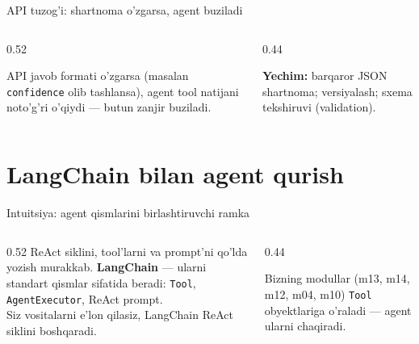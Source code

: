 \documentclass[aspectratio=169,11pt]{beamer}
\begin{document}
\begin{frame}{API tuzog'i: shartnoma o'zgarsa, agent buziladi}
  \begin{columns}[T]
    \begin{column}{0.52\textwidth}
      \begin{tcolorbox}[warnbox,title={Mos kelmagan JSON}]
        \small
        API javob formati o'zgarsa (masalan \texttt{confidence} olib tashlansa),
        agent tool natijani noto'g'ri o'qiydi --- butun zanjir buziladi.
      \end{tcolorbox}
    \end{column}
    \begin{column}{0.44\textwidth}
      \begin{tcolorbox}[okbox,top=2pt,bottom=2pt]
        \footnotesize
        \textbf{Yechim:} barqaror JSON shartnoma; versiyalash; sxema tekshiruvi
        (validation).
      \end{tcolorbox}
    \end{column}
  \end{columns}
\end{frame}

\section[LangChain]{LangChain bilan agent qurish}

\begin{frame}{Intuitsiya: agent qismlarini birlashtiruvchi ramka}
  \begin{columns}[T]
    \begin{column}{0.52\textwidth}
      \small
      ReAct siklini, tool'larni va prompt'ni qo'lda yozish murakkab.
      \textbf{LangChain} --- ularni standart qismlar sifatida beradi:
      \texttt{Tool}, \texttt{AgentExecutor}, ReAct prompt.\\[5pt]
      Siz vositalarni e'lon qilasiz, LangChain ReAct siklini boshqaradi.
    \end{column}
    \begin{column}{0.44\textwidth}
      \begin{tcolorbox}[okbox,top=2pt,bottom=2pt]
        \footnotesize
        Bizning modullar (m13, m14, m12, m04, m10) \texttt{Tool} obyektlariga
        o'raladi --- agent ularni chaqiradi.
      \end{tcolorbox}
    \end{column}
  \end{columns}
\end{frame}
\end{document}
